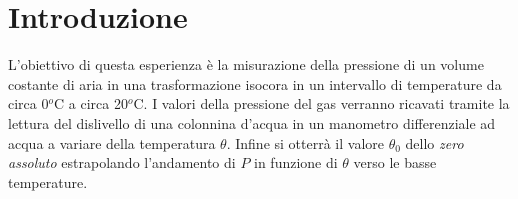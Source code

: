 \section{Introduzione}
L'obiettivo di questa esperienza è la misurazione della pressione di un volume costante di aria in una trasformazione isocora in un intervallo di temperature da circa 0$^o$C a circa 20$^o$C. I valori della pressione del gas verranno ricavati tramite la lettura del dislivello di una colonnina d'acqua in un manometro differenziale ad acqua a variare della temperatura $\theta$.
Infine si otterrà il valore $\theta_0$ dello \emph{zero assoluto} estrapolando l'andamento di $P$ in funzione di $\theta$ verso le basse temperature.
